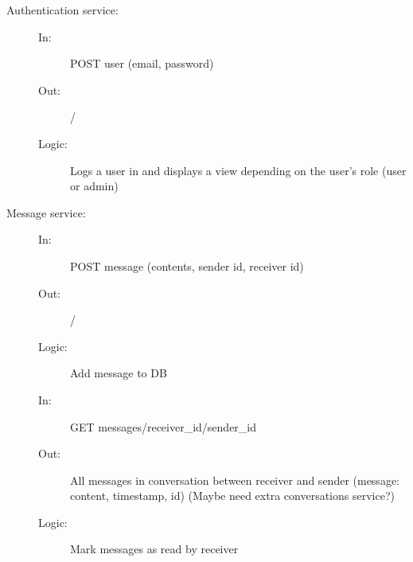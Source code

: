 \documentclass{article}
\begin{document}
\begin{description}
    \item [Authentication service:] 
    \begin{description}
        \item[]
        \item[In:] POST user (email, password)
        \item[Out:] /
        \item[Logic:] Logs a user in and displays a view depending on the user's role (user or admin)
        \item[]
    \end{description}
\end{description}

\begin{description}
    \item [Message service:] 
    \begin{description}
        \item[]
        \item[In:] POST message (contents, sender id, receiver id)
        \item[Out:] /
        \item[Logic:] Add message to DB
        \item[]
        
        \item[In:] GET messages/receiver\_id/sender\_id
        \item[Out:] All messages in conversation between receiver and sender (message: content, timestamp, id) (Maybe need extra conversations service?)
        \item[Logic:] Mark messages as read by receiver
        \item[]
    \end{description}
\end{description}
\end{document}
